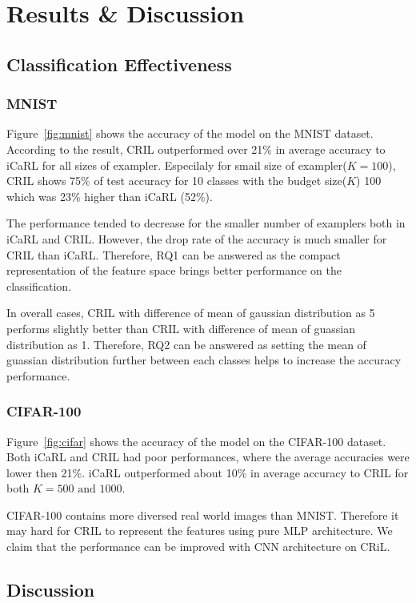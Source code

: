 \section{Results \& Discussion}
\label{sec:results}

\subsection{Classification Effectiveness}
\label{sec:results_effect}

\subsubsection{MNIST}
\label{sec:results_mnist}



Figure~\ref{fig:mnist} shows the accuracy of the model on the MNIST dataset. According to the result, CRIL outperformed over 21\% in average accuracy to iCaRL for all sizes of exampler. 
Especilaly for smail size of exampler($K=100$), CRIL shows 75\% of test accuracy for 10 classes with the budget size($K$) 100 which was 23\% higher than iCaRL (52\%).

The performance tended to decrease for the smaller number of examplers both in iCaRL and CRIL. However, the drop rate of the accuracy is much smaller for CRIL than iCaRL. Therefore, RQ1 can be answered as the compact representation of the feature space brings better performance on the classification.

In overall cases, CRIL with difference of mean of gaussian distribution as 5 performs slightly better than CRIL with difference of mean of guassian distribution as 1. Therefore, RQ2 can be answered as setting the mean of guassian distribution further between each classes helps to increase the accuracy performance.

\subsubsection{CIFAR-100}
\label{sec:results_cifar}


Figure~\ref{fig:cifar} shows the accuracy of the model on the CIFAR-100 dataset. Both iCaRL and CRIL had poor performances, where the average accuracies were lower then 21\%. iCaRL outperformed about 10\% in average accuracy to CRIL for both $K=500\textrm{ and }1000$.

CIFAR-100 contains more diversed real world images than MNIST. Therefore it may hard for CRIL to represent the features using pure MLP architecture. We claim that the performance can be improved with CNN architecture on CRiL.

\subsection{Discussion}

